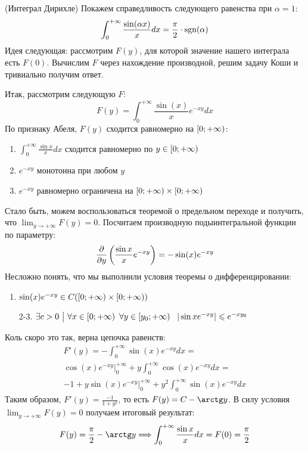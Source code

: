\begin{example} (Интеграл Дирихле)
	Покажем справедливость следующего равенства при $\alpha = 1$:
	\[
		\int_0^{+\infty} \frac{\sin(\alpha x)}{x}dx = \frac{\pi}{2} \cdot \operatorname{sgn}(\alpha)
	\]
	Идея следующая: рассмотрим $F(y)$, для которой значение нашего интеграла есть $F(0)$. Вычислим $F$ через нахождение производной, решим задачу Коши и тривиально получим ответ.
	
	Итак, рассмотрим следующую $F$:
	\[
		F(y) = \int_0^{+\infty} \frac{\sin(x)}{x}e^{-xy}dx
	\]
	По признаку Абеля, $F(y)$ сходится равномерно на $\left[0; +\infty\right)$:
	\begin{enumerate}
		\item $\int_0^{+\infty} \frac{\sin x}{x}dx$ сходится равномерно по $y \in \left[0; +\infty\right)$
		
		\item $e^{-xy}$ монотонна при любом $y$
		
		\item $e^{-xy}$ равномерно ограничена на $\left[0; +\infty\right) \times \left[0; +\infty\right)$
	\end{enumerate}
	Стало быть, можем воспользоваться теоремой о предельном переходе и получить, что $\lim_{y \to +\infty} F(y) = 0$. Посчитаем производную подыинтегральной функции  по параметру:
	\[
		\frac{\partial }{\partial y}\left(\frac{\sin x}{x}e^{-xy}\right) = -\sin(x)e^{-xy}
	\]
	Несложно понять, что мы выполнили условия теоремы о дифференцировании:
	\begin{enumerate}
		\item $\sin(x)e^{-xy} \in C(\left[0; +\infty\right) \times \left[0; +\infty\right))$
		
		\item[2-3.] $\exists c > 0 \ \big|\  \forall x \in \left[0; +\infty\right)\ \forall y \in \left[y_0; +\infty\right)\ \ |\sin x e^{-xy}| \leqslant e^{-xy_0}$
	\end{enumerate}
	Коль скоро это так, верна цепочка равенств:
	\begin{multline*}
		F'(y) = -\int_0^{+\infty} \sin(x)e^{-xy}dx =
		\\
		\cos(x)e^{-xy}\Big|_0^{+\infty} + y\int_0^{+\infty} \cos(x)e^{-xy}dx =
		\\
		-1 + y\sin(x)e^{-xy}\Big|_0^{+\infty} + y^2\int_0^{+\infty} \sin(x)e^{-xy}dx
	\end{multline*}
	Таким образом, $F'(y) = \frac{-1}{1 + y^2}$, то есть $F(y) = C - \arctg y$. В силу условия $\lim_{y \to +\infty} F(y) = 0$ получаем итоговый результат:
	\[
		F(y) = \frac{\pi}{2} - \arctg y \Lora \int_0^{+\infty} \frac{\sin x}{x}dx = F(0) = \frac{\pi}{2}
	\]
\end{example}

